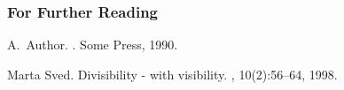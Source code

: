\documentclass[10pt,serif, professionalfont]{beamer}
\begin{document}
\begin{frame}[allowframebreaks]
  \frametitle<presentation>{For Further Reading}
    
  \begin{thebibliography}{10}
    
  \beamertemplatebookbibitems

    A.~Author.
    .
    \newblock Some Press, 1990.
 
    
  \beamertemplatearticlebibitems

    Marta Sved.
    \newblock Divisibility - with visibility.
    , 10(2):56--64,
    1998.
  \end{thebibliography}
\end{frame}
\end{document}
